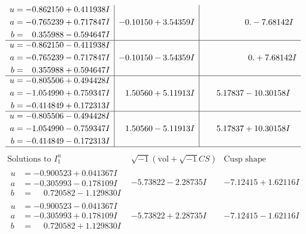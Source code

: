 \documentclass[1p]{elsarticle_modified}
\theoremstyle{definition}
\newcommand{\I}{\sqrt{-1}}
\begin{document}
$$\begin{array}{c|c|c}
\begin{aligned}
u &= -0.862150 + 0.411938 I \\
a &= -0.765239 + 0.717847 I \\
b &= \phantom{-}0.355988 - 0.594647 I\end{aligned}
 & -0.10150 + 3.54359 I & \phantom{-0.000000 } 0. - 7.68142 I \\ \hline\begin{aligned}
u &= -0.862150 - 0.411938 I \\
a &= -0.765239 - 0.717847 I \\
b &= \phantom{-}0.355988 + 0.594647 I\end{aligned}
 & -0.10150 - 3.54359 I & \phantom{-0.000000 -}0. + 7.68142 I \\ \hline\begin{aligned}
u &= -0.805506 + 0.494428 I \\
a &= -1.054990 + 0.759347 I \\
b &= -0.414849 + 0.172313 I\end{aligned}
 & \phantom{-}1.50560 + 5.11913 I & \phantom{-}5.17837 - 10.30158 I \\ \hline\begin{aligned}
u &= -0.805506 - 0.494428 I \\
a &= -1.054990 - 0.759347 I \\
b &= -0.414849 - 0.172313 I\end{aligned}
 & \phantom{-}1.50560 - 5.11913 I & \phantom{-}5.17837 + 10.30158 I\\
 \hline 
 \end{array}$$\newpage$$\begin{array}{c|c|c}  
\text{Solutions to }I^u_{1}& \I (\text{vol} + \sqrt{-1}CS) & \text{Cusp shape}\\
 \hline 
\begin{aligned}
u &= -0.900523 + 0.041367 I \\
a &= -0.305993 - 0.178109 I \\
b &= \phantom{-}0.720582 - 1.129830 I\end{aligned}
 & -5.73822 - 2.28735 I & -7.12415 + 1.62116 I \\ \hline\begin{aligned}
u &= -0.900523 - 0.041367 I \\
a &= -0.305993 + 0.178109 I \\
b &= \phantom{-}0.720582 + 1.129830 I\end{aligned}
 & -5.73822 + 2.28735 I & -7.12415 - 1.62116 I \\ \hline\begin{aligned}

\end{aligned}
\end{array}$$
\end{document}

